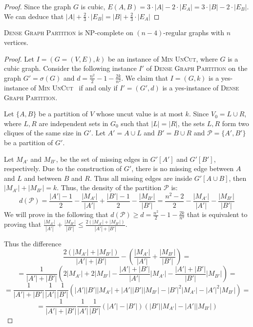 \documentclass[a4paper,USenglish,cleveref, autoref]{lipics-v2021}
\newcommand\DGP{\textsc{Dense Graph Partition}}
\newcommand\UC{\textsc{Min UnCut}}
\begin{document}
\begin{proof}
Since the graph $G$ is cubic, 
$E(A,B)  = 3\cdot |A| - 2 \cdot|E_A|  = 3\cdot |B| - 2 \cdot |E_B|$.
We can deduce that $|A| + \frac{2}{3} \cdot |E_B| = |B| + \frac{2}{3} \cdot |E_A|$ 
\end{proof}


\begin{theorem}\label{denseNP}
\DGP{} is NP-complete on $(n-4)$-regular graphs with $n$ vertices.
\end{theorem}

\begin{proof}
Let $I=(G=(V,E),k)$ be an instance of \UC,  where $G$ is a cubic graph.  Consider the following instance $I'$ of \DGP{} on the graph $G' = \sigma(G)$ and $d=\frac{n^2}{2} - 1 - \frac{2k}{n^2}$. We claim that $I= (G,k)$ is a yes-instance of \UC~ if and only if $I' = (G',d)$ is a yes-instance of \DGP.
\medskip

Let $\{A,B\}$ be a partition of $V$ whose  uncut value is at most $k$. Since $V_0=L\cup R$, where $L,R$ are independent sets in $G_0$ such that $|L|=|R|$, the sets $L,R$ form two cliques of the same size in $G'$. Let $A' = A \cup L$ and $B' = B \cup R$  and $\mathcal{P}=\{A',B'\}$ be a partition of $G'$. 

Let ${M}_{A'}$ and ${M}_{B'}$, be the set of missing edges in $G'[A']$ and $G'[B']$, respectively. 
Due to the construction of $G'$, there is no missing edge  between $A$ and $L$ and between $B$ and $R$. Thus all missing edges are inside $G'[A\cup B]$, then $|{M}_{A'}| + |{M}_{B'}| = k$. Thus, the density of the partition $\mathcal{P}$ is: 
$$ d(\mathcal{P}) = \frac{|A'|-1}{2} - \frac{|{M}_{A'}|}{|A'|} + \frac{|B'|-1}{2} - \frac{|{M}_{B'}|}{|B'|} 
       = \frac{n^2-2}{2} - \frac{|{M}_{A'}|}{|A'|} - \frac{|{M}_{B'}|}{|B'|}
$$
We will prove in the following that  $d(\mathcal{P})
\geq d=\frac{n^2}{2} - 1 - \frac{2k}{n^2}$ that is equivalent to proving that $\frac{|{M}_{A'}|}{|A'|} + \frac{|{M}_{B'}|}{|B'|} \leq \frac{2(|M_{A'}|+|M_{B'}|)}{|A'|+|B'|}$.


Thus the difference 
$$  \frac{2(|M_{A'}|+|M_{B'}|)}{|A'|+|B'|} - \left(\frac{|M_{A'}|}{|A'|} + \frac{|M_{B'}|}{|B'|}\right)=$$
$$=\frac{1}{|A'|+|B'|} \left( 2|M_{A'}|+2|M_{B'}| - \frac{|A'|+|B'|}{|A'|} |M_{A'}|-\frac{|A'|+|B'|}{|B'|} |M_{B'}|\right)=$$
$$=\frac{1}{|A'|+|B'|} \frac{1}{|A'|} \frac{1}{|B'|} (|A'||B'| |M_{A'}|+ |A'||B'| |M_{B'}|-|B'|^2 |M_{A'}|- |A'|^2 |M_{B'}|)=
$$
$$ =\frac{1}{|A'|+|B'|} \frac{1}{|A'|} \frac{1}{|B'|} (|A'|-|B'|)(|B'||M_{A'}|-|A'||M_{B'}|)
$$


\end{proof}
\end{document}

